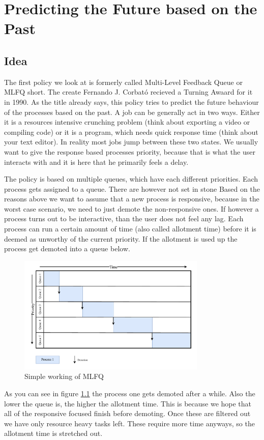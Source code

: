 \chapter{Predicting the Future based on the Past}

\section{Idea}

The first policy we look at is formerly called Multi-Level Feedback Queue or MLFQ short. The create Fernando J. Corbató recieved a Turning Awaard for it in 1990. 
As the title already says, this policy tries to predict the future behaviour of the processes based on the past.
A job can be generally act in two ways.
Either it is a resources intensive crunching problem (think about exporting a video or compiling code) or it is a program, which needs quick response time (think about your text editor).
In reality most jobs jump between these two states.
We usually want to give the response based processes priority, because that is what the user interacts with and it is here that he primarily feels a delay.

The policy is based on multiple queues, which have each different priorities.
Each process gets assigned to a queue. There are however not set in stone
Based on the reasons above we want to assume that a new process is responsive, because in the worst case scenario, we need to just demote the non-responsive ones.
If however a process turns out to be interactive, than the user does not feel any lag. 
Each process can run a certain amount of time (also called allotment time) before it is deemed as unworthy of the current priority.
If the allotment is used up the process get demoted into a queue below.

\begin{figure}[h]
    \centering
    \includegraphics[width=0.8\textwidth]{Assets/MLFQ-Example-1.pdf}
    \caption{Simple working of MLFQ}
    \label{fig:mlfq-example-1}
\end{figure}


As you can see in figure \ref{fig:mlfq-example-1} the process one gets demoted after a while.
Also the lower the queue is, the higher the allotment time. 
This is because we hope that all of the responsive focused finish before demoting.
Once these are filtered out we have only resource heavy tasks left.
These require more time anyways, so the allotment time is stretched out.


